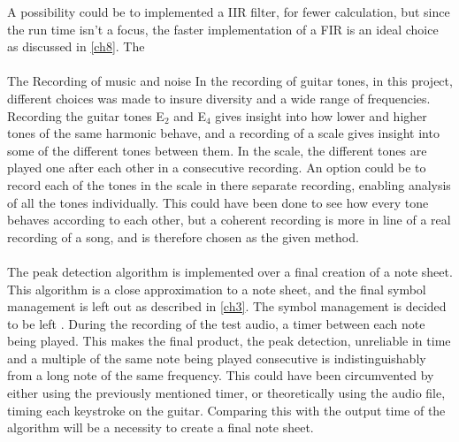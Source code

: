 A possibility could be to implemented a IIR filter, for fewer calculation, but since the run time isn't a focus, the faster implementation of a FIR is an ideal choice as discussed in \ref{ch8}.
The 
\\\\
The Recording of music and noise 
In the recording of guitar tones, in this project, different choices was made to insure diversity and a wide range of frequencies.
Recording the guitar tones E$_2$ and E$_4$ gives insight into how lower and higher tones of the same harmonic behave, and a recording of a scale gives insight into some of the different tones between them.
In the scale, the different tones are played one after each other in a consecutive recording. 
An option could be to record each of the tones in the scale in there separate recording, enabling analysis of all the tones individually.
This could have been done to see how every tone behaves according to each other, but a coherent recording is more in line of a real recording of a song, and is therefore chosen as the given method.
\\\\
The peak detection algorithm is implemented over a final creation of a note sheet.
This algorithm is a close approximation to a note sheet, and the final symbol management is left out as described in \ref{ch3}.
The symbol management is decided to be left .
During the recording of the test audio, a timer between each note being played.
This makes the final product, the peak detection, unreliable in time and a multiple of the same note being played consecutive is indistinguishably from a long note of the same frequency.
This could have been circumvented by either using the previously mentioned timer, or theoretically using the audio file, timing each keystroke on the guitar.
Comparing this with the output time of the algorithm will be a necessity to create a final note sheet.





